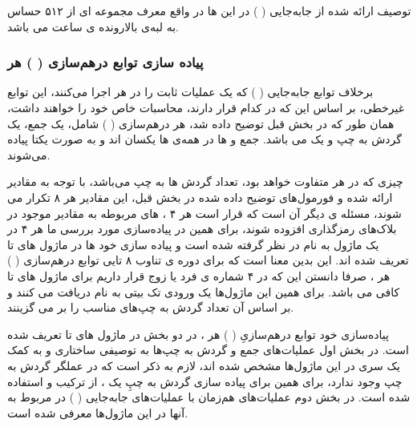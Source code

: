 توصیف ارائه شده از جابه‌جایی 
(
)
در این 
ها در واقع معرف مجموعه ای از ۵۱۲ 
 حساس به لبه‌ی بالا‌رونده ی ساعت می باشد.
 
 \subsubsection{
 پیاده سازی توابع درهم‌سازی 
 (
 )
 هر
}
برخلاف توابع جابه‌جایی (
) که یک عملیات ثابت را در هر 
اجرا می‌کنند، این توابع غیر‌خطی، بر اساس این که در کدام
قرار دارند،‌ محاسبات خاص خود را خواهند داشت، همان طور که در بخش قبل توضیح داده شد، هر درهم‌سازی (
) شامل، یک جمع، یک گردش به چپ و یک
می باشد. جمع و  ها در همه‌ی  ها یکسان‌ اند و به صورت یکتا پیاده می‌شوند.

 چیزی که در هر
  متفاوت خواهد بود، تعداد گردش ها به چپ می‌باشد،
با توجه به مقادیر ارائه شده و فورمول‌های توضیح داده شده در بخش قبل، این مقادیر هر ۸ 
 تکرار می شوند، مسئله ی دیگر آن است که قرار است هر ۴ 
 ،
   های مربوطه به مقادیر موجود در بلاک‌های رمزگذاری افزوده شوند، برای همین در پیاده‌سازی مورد بررسی ما هر ۴ 
   در یک ماژول به نام
    در نظر گرفته شده است و پیاده سازی خود 
     ها در ماژول های  
     تا 
     تعریف شده اند.
     این بدین معنا است که برای دوره ی تناوب ۸ تایی توابع درهم‌سازی (
     ) هر 
     ، صرفا دانستن این که در ۴   شماره ی فرد یا زوج قرار داریم برای ماژول های 
     تا 
     کافی می باشد. برای همین این ماژول‌ها یک ورودی تک بیتی به نام
     دریافت می کنند و بر اساس آن تعداد گردش به چپ‌های مناسب را بر می گزینند.
     
     پیاده‌‌سازی خود توابع درهم‌سازیِ (
     ) هر 
   ، در دو بخش در ماژول های 
    تا 
تعریف شده است.
در بخش اول عملیات‌های جمع و گردش به چپ‌ها به توصیفی ساختاری و به کمک یک سری 
در این ماژول‌ها مشخص شده‌ اند، لازم به ذکر است که در 
عملگر گردش به چپ وجود ندارد، برای همین برای پیاده سازی گردش به چپِ یک ، از ترکیب  و  استفاده شده است.
 در بخش دوم عملیات‌های
هم‌زمان با عملیات‌های جابه‌جایی (
)
در 
مربوط به آنها در این ماژول‌ها معرفی شده است.

